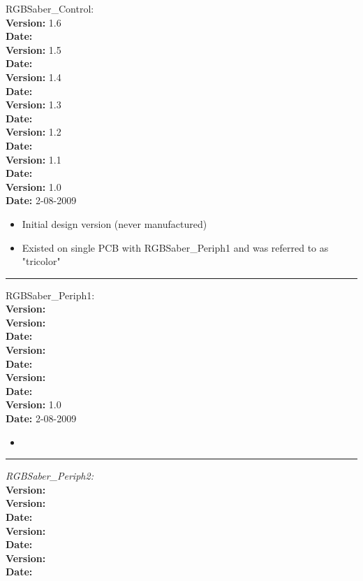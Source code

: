 \documentclass[12pt,letterpaper,onecolumn]{article}
\begin{document}
\newline
RGBSaber\_Control: \\
\textbf{Version:} 1.6 \\
\textbf{Date:} \\

\textbf{Version:} 1.5 \\
\textbf{Date:} \\

\textbf{Version:} 1.4\\
\textbf{Date:} \\

\textbf{Version:} 1.3\\
\textbf{Date:} \\

\textbf{Version:} 1.2\\
\textbf{Date:} \\

\textbf{Version:} 1.1\\
\textbf{Date:} \\

\textbf{Version:} 1.0\\
\textbf{Date:} 2-08-2009\\
\begin{itemize}
\item Initial design version (never manufactured)
\item Existed on single PCB with RGBSaber\_Periph1 and was referred to as "tricolor"
\end{itemize}

\hrule
RGBSaber\_Periph1: \\
\textbf{Version:} \\

\textbf{Version:} \\
\textbf{Date:} \\

\textbf{Version:} \\
\textbf{Date:} \\

\textbf{Version:} \\
\textbf{Date:} \\

\textbf{Version:} 1.0\\
\textbf{Date:} 2-08-2009\\
\begin{itemize}
\item
\end{itemize}
\hrule
\noindent
\emph{RGBSaber\_Periph2:} \\
\textbf{Version:} \\

\textbf{Version:} \\
\textbf{Date:} \\

\textbf{Version:} \\
\textbf{Date:} \\

\textbf{Version:} \\
\textbf{Date:} \\
\end{document}
